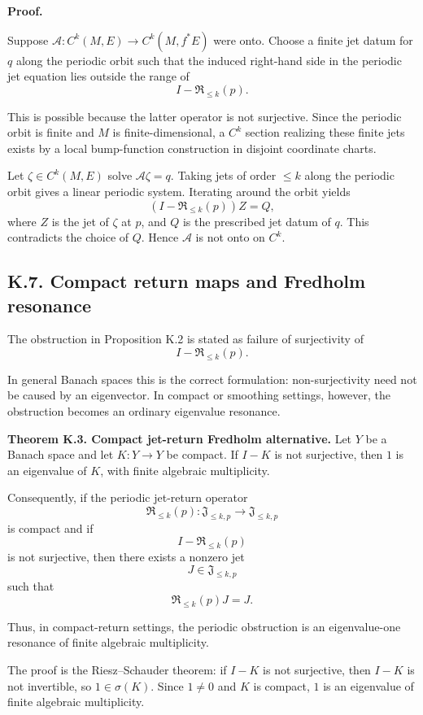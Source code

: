 \documentclass[12pt,a4paper]{article}
\theoremstyle{plain}
\numberwithin{equation}{section}
\numberwithin{theorem}{section}
\begin{document}
\textbf{Proof.}

Suppose $\mathcal A:C^k(M,E)\to C^k(M,f^*E)$ were onto. Choose a finite jet datum for $q$ along the periodic orbit such that the induced right-hand side in the periodic jet equation lies outside the range of
\[
I-
\mathfrak R_{\le k}(p).
\]

This is possible because the latter operator is not surjective. Since the periodic orbit is finite and $M$ is finite-dimensional, a $C^k$ section realizing these finite jets exists by a local bump-function construction in disjoint coordinate charts.

Let $\zeta\in C^k(M,E)$ solve $\mathcal A\zeta=q$. Taking jets of order $\le k$ along the periodic orbit gives a linear periodic system. Iterating around the orbit yields
\[
(I-
\mathfrak R_{\le k}(p))Z=Q,
\]
where $Z$ is the jet of $\zeta$ at $p$, and $Q$ is the prescribed jet datum of $q$. This contradicts the choice of $Q$. Hence $\mathcal A$ is not onto on $C^k$.

\subsection{K.7. Compact return maps and Fredholm resonance}

The obstruction in Proposition K.2 is stated as failure of surjectivity of
\[
I-\mathfrak R_{\le k}(p).
\]

In general Banach spaces this is the correct formulation: non-surjectivity need not be caused by an eigenvector. In compact or smoothing settings, however, the obstruction becomes an ordinary eigenvalue resonance.

\textbf{Theorem K.3. Compact jet-return Fredholm alternative.} Let $Y$ be a Banach space and let $K:Y\to Y$ be compact. If $I-K$ is not surjective, then $1$ is an eigenvalue of $K$, with finite algebraic multiplicity.

Consequently, if the periodic jet-return operator
\[
\mathfrak R_{\le k}(p):\mathfrak J_{\le k,p}\to\mathfrak J_{\le k,p}
\]
is compact and if
\[
I-\mathfrak R_{\le k}(p)
\]
is not surjective, then there exists a nonzero jet
\[
J\in\mathfrak J_{\le k,p}
\]
such that
\[
\mathfrak R_{\le k}(p)J=J.
\]

Thus, in compact-return settings, the periodic obstruction is an eigenvalue-one resonance of finite algebraic multiplicity.

The proof is the Riesz--Schauder theorem: if $I-K$ is not surjective, then $I-K$ is not invertible, so $1\in\sigma(K)$. Since $1\ne0$ and $K$ is compact, $1$ is an eigenvalue of finite algebraic multiplicity.
\end{document}
